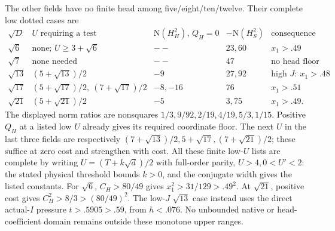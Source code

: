 The other fields have no finite head
among five/eight/ten/twelve.
Their complete low dotted cases are
\[
\begin{array}{c|c|c|c|l}
 \sqrt D&U\text{ requiring a test}&\mathrm N(H_H^2),\,Q_H=0&
                    -\mathrm N(H_S^2)&\text{consequence}\\ \hline
 \sqrt6&\text{none; }U\ge3+\sqrt6&--&23,60&x_1>.49\\
 \sqrt7&\text{none needed}&--&47&\text{no head floor}\\
 \sqrt{13}&(5+\sqrt{13})/2&-9&27,92&
                                  \text{high }J:\ x_1>.48\\
 \sqrt{17}&(5+\sqrt{17})/2,\ (7+\sqrt{17})/2&-8,-16&76&x_1>.51\\
 \sqrt{21}&(5+\sqrt{21})/2&-5&3,75&x_1>.49 .
\end{array}
\]
The displayed norm ratios are nonsquares
\(1/3,9/92,2/19,4/19,5/3,1/15\).
Positive \(Q_H\) at a listed low \(U\)
already gives its required coordinate floor.
The next \(U\) in the last three fields
are respectively
\((7+\sqrt{13})/2,5+\sqrt{17},(7+\sqrt{21})/2\);
these suffice at zero cost and strengthen
with cost.
All these finite low-\(U\) lists are
complete by writing
\(U=(T+k\sqrt d)/2\) with full-order parity,
\(U>4,0<U'<2\): the stated physical
threshold bounds \(k>0\), and the
conjugate width gives the listed constants.
For \(\sqrt6\),
\(C_H>80/49\) gives \(x_1^2>31/129>.49^2\).
At \(\sqrt{21}\), positive cost gives
\(C_H^2>8/3>(80/49)^2\).
The low-\(J\) \(\sqrt{13}\) case instead
uses the direct actual-\(I\) pressure
\(t>.5905>.59\), from \(h<.076\).
No unbounded native or head-coefficient
domain remains outside these monotone
upper ranges.

